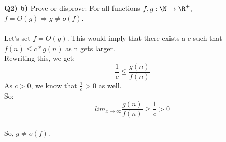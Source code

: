 \documentclass[11pt]{article}
\begin{document}
    \\\\
\textbf{Q2) b) }Prove or disprove: For all functions $f,g : \N\rightarrow \R^+,$ $f=O(g) \Rightarrow g\neq o(f)$.
\\\\
Let's set $f = O(g)$. This would imply that there exists a $c$ such that $f(n) \leq c*g(n)$ as n gets larger.
\\
Rewriting this, we get:
\begin{equation*}
    \frac{1}{c} \leq \frac{g(n)}{f(n)}
\end{equation*}
As $c > 0$, we know that $\frac{1}{c} > 0$ as well.
\\ So:
\begin{equation*}
     lim_{x\to\infty}\frac{g(n)}{f(n)} \geq \frac{1}{c} > 0
\end{equation*}
\\ So, $g \neq o(f)$.
\end{document}

